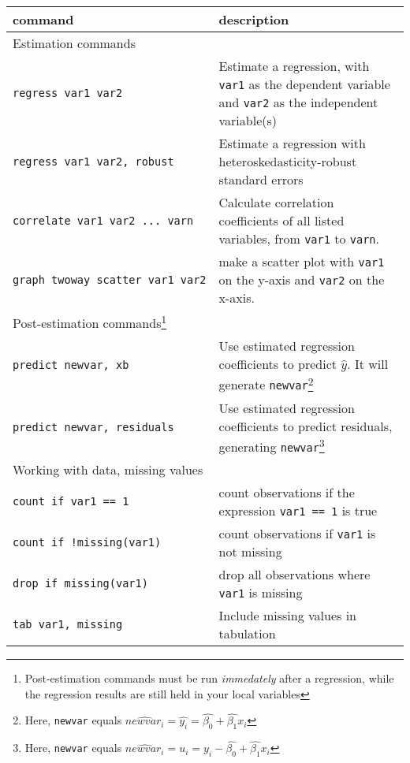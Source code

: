 \documentclass[11pt]{article}
\begin{document}
\begin{longtable}[]{@{}
  >{\raggedright\arraybackslash}p{}
  >{\raggedleft\arraybackslash}p{}@{}}
\toprule
command & description \\
\midrule
\endhead
Estimation commands & \\
\texttt{regress\ var1\ var2} & Estimate a regression, with \texttt{var1}
as the dependent variable and \texttt{var2} as the independent
variable(s) \\
\texttt{regress\ var1\ var2,\ robust} & Estimate a regression with
heteroskedasticity-robust standard errors \\
\texttt{correlate\ var1\ var2\ ...\ varn} & Calculate correlation
coefficients of all listed variables, from \texttt{var1} to
\texttt{varn}. \\
\texttt{graph\ twoway\ scatter\ var1\ var2} & make a scatter plot with
\texttt{var1} on the y-axis and \texttt{var2} on the x-axis. \\
Post-estimation commands\footnote{Post-estimation commands must be run
  \emph{immedately} after a regression, while the regression results are
  still held in your local variables} & \\
\texttt{predict\ newvar,\ xb} & Use estimated regression coefficients to
predict \(\widehat{y}\). It will generate \texttt{newvar}\footnote{Here,
  \texttt{newvar} equals
  \(\widehat{newvar_i} = \widehat{y_i} = \widehat{\beta_0} + \widehat{\beta_1}x_i\)} \\
\texttt{predict\ newvar,\ residuals} & Use estimated regression
coefficients to predict residuals, generating
\texttt{newvar}\footnote{Here, \texttt{newvar} equals
  \(\widehat{newvar_i} = u_i = y_i - \widehat{\beta_0} + \widehat{\beta_1}x_i\)} \\
Working with data, missing values & \\
\texttt{count\ if\ var1\ ==\ 1} & count observations if the expression
\texttt{var1\ ==\ 1} is true \\
\texttt{count\ if\ !missing(var1)} & count observations if \texttt{var1}
is not missing \\
\texttt{drop\ if\ missing(var1)} & drop all observations where
\texttt{var1} is missing \\
\texttt{tab\ var1,\ missing} & Include missing values in tabulation \\
\bottomrule
\end{longtable}
\end{document}
